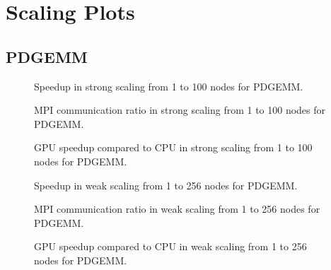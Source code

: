 \chapter{Scaling Plots}
\section{PDGEMM}
\begin{figure}[]
	\begin{center}
		
	\end{center}
	\caption{Speedup in strong scaling from 1 to 100 nodes for PDGEMM.}
	\label{fig:scaling1}
\end{figure}
\begin{figure}[]
	\begin{center}
		
	\end{center}
	\caption{MPI communication ratio in strong scaling from 1 to 100 nodes for PDGEMM.}
	\label{fig:scaling2}
\end{figure}
\begin{figure}[]
	\begin{center}
		
	\end{center}
	\caption{GPU speedup compared to CPU in strong scaling from 1 to 100 nodes for PDGEMM.}
	\label{fig:scaling3}
\end{figure}
\begin{figure}[]
	\begin{center}
		
	\end{center}
	\caption{Speedup in weak scaling from 1 to 256 nodes for PDGEMM.}
	\label{fig:scaling4}
\end{figure}
\begin{figure}[]
	\begin{center}
		
	\end{center}
	\caption{MPI communication ratio in weak scaling from 1 to 256 nodes for PDGEMM.}
	\label{fig:scaling5}
\end{figure}
\begin{figure}[]
	\begin{center}
		
	\end{center}
	\caption{GPU speedup compared to CPU in weak scaling from 1 to 256 nodes for PDGEMM.}
	\label{fig:scaling3}
\end{figure}
\clearpage
